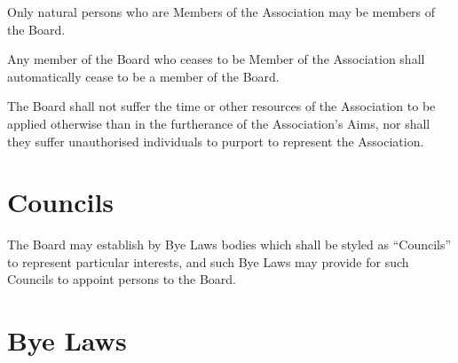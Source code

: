 \documentclass[10pt]{mk-articles-of-association}
\newcommand{\EC}[0]{Board}
\newcommand{\Exec}[0]{\EC{} }
\begin{document}
\begin{constenum}
  \item Only natural persons who are Members of the Association
    may be members of the \EC{}.

  \item Any member of the \Exec who ceases to be Member of the Association
    shall automatically cease to be a member of the \EC{}.

  \item The \Exec shall not suffer the time or other resources of
    the Association to be applied otherwise than in the furtherance of
    the Association's Aims, nor shall they suffer unauthorised individuals
    to purport to represent the Association.

\end{constenum}



\section{Councils}
\label{councils}

The \EC{} may establish by Bye Laws bodies which
  shall be styled as ``Councils'' to represent particular interests, and
  such Bye Laws may provide for such Councils to appoint persons to
  the \EC{}.



\section{Bye Laws}
\end{document}
